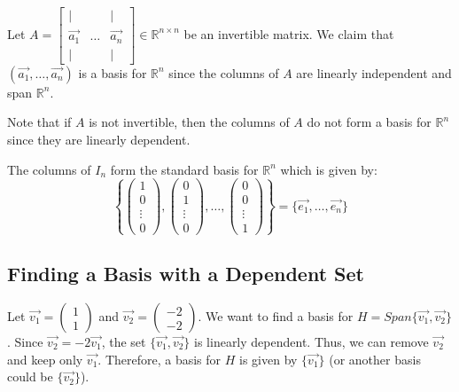 \begin{eg}
    Let $A = \begin{bmatrix}
        | & & | \\
        \vec{a_1} & \ldots & \vec{a_n} \\
        | & & |
    \end{bmatrix} \in \mathbb{R}^{n \times n}$ be an invertible matrix. We claim that $(\vec{a_1}, \ldots, \vec{a_n})$ is a basis for $\mathbb{R}^n$ since the columns of $A$ are linearly independent and span $\mathbb{R}^n$.
\end{eg}
Note that if $A$ is not invertible, then the columns of $A$ do not form a basis for $\mathbb{R}^n$ since they are linearly dependent.
\begin{eg}
    The columns of $I_n$ form the standard basis for $\mathbb{R}^n$ which is given by:
    \[ \left\{ \begin{pmatrix}
        1 \\ 0 \\ \vdots \\ 0
    \end{pmatrix}, \begin{pmatrix}
        0 \\ 1 \\ \vdots \\ 0
    \end{pmatrix}, \ldots, \begin{pmatrix}
        0 \\ 0 \\ \vdots \\ 1
    \end{pmatrix} \right\} = \{ \vec{e_1}, \ldots, \vec{e_n} \} \]
\end{eg}

\subsection{Finding a Basis with a Dependent Set}
\begin{eg}
    Let $\vec{v_1} = \begin{pmatrix}
        1 \\ 1
    \end{pmatrix}$ and $\vec{v_2} = \begin{pmatrix}
        -2 \\ -2
    \end{pmatrix}$. We want to find a basis for $H = Span\{\vec{v_1}, \vec{v_2}\}$. Since $\vec{v_2} = -2\vec{v_1}$, the set $\{\vec{v_1}, \vec{v_2}\}$ is linearly dependent. Thus, we can remove $\vec{v_2}$ and keep only $\vec{v_1}$. Therefore, a basis for $H$ is given by $\{\vec{v_1}\}$ (or another basis could be $\{\vec{v_2}\}$).
\end{eg}

